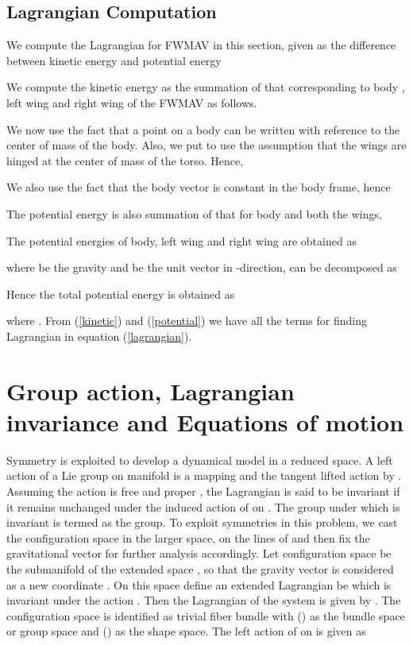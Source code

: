 \documentclass[letterpaper, 10 pt, conference]{ieeeconf}  \newcommand{\RN}[1]{\textup{\uppercase\expandafter{\romannumeral#1}}}
\begin{document}
\subsection{Lagrangian Computation}

We compute the Lagrangian  for FWMAV in this section, given as the difference between kinetic energy  and potential energy 



We compute the kinetic energy as the summation of that corresponding to body , left wing  and right wing  of the FWMAV as follows.


We now use the fact that a point on a body can be written with reference to the center of mass of the body. Also, we put to use the assumption that the wings are hinged at the center of mass of the torso. Hence,

We also use the fact that the body vector is constant in the body frame, hence

The potential energy is also summation of that for body and both the wings,

The potential energies of body, left wing and right wing are obtained as

where  be the gravity and  be the unit vector in -direction,  can be decomposed as 

Hence the total potential energy is obtained as

where . From (\ref{kinetic}) and (\ref{potential}) we have all the terms for finding Lagrangian in equation (\ref{lagrangian}).
\section{Group action, Lagrangian invariance and Equations of motion}
Symmetry is exploited to develop a dynamical model in a reduced space. A left action of a Lie group  on manifold  is a mapping  and the tangent lifted action by . Assuming the action is free and proper \cite{Marsden Ratiu intro to}, the Lagrangian  is said to be invariant if it remains unchanged under the induced action of  on . The group under which  is invariant is termed as the  group. To exploit symmetries in this problem, we cast the configuration space in the larger space, on the lines of \cite{holm} and then fix the gravitational vector for further analysis accordingly. Let configuration space  be the submanifold of the extended space , so that the gravity vector  is considered as a new coordinate . On this space define an extended Lagrangian  be  which is invariant under the action . Then the Lagrangian of the system is given by . The configuration space is identified as trivial fiber bundle with () as the bundle space or group space and () as the shape space. The left action of  on  is given as
\end{document}
